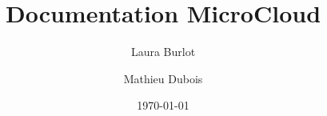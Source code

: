 \documentclass[a4paper]{article}
\title{Documentation MicroCloud}
\author{Laura Burlot \and Mathieu Dubois}
\date{\today}
\begin{document}
\maketitle
\sloppy
\newpage

\tableofcontents
\newpage
















\end{document}
